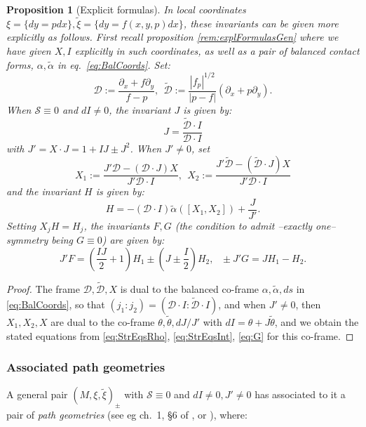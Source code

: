 \documentclass[10pt]{amsart}
\newcommand{\del}{\partial}
\newtheorem{prop}[thm]{Proposition}
\theoremstyle{definition}
\begin{document}
\begin{prop}[Explicit formulas]\label{rem:S0Sum}
    In local coordinates $\xi = \{ dy = pdx\}, \tilde \xi = \{ dy = f(x,y,p) dx\}$, these invariants can be given more explicitly as follows. First recall proposition \ref{rem:explFormulasGen} where we have given $X, I$ explicitly in such coordinates, as well as a pair of balanced contact forms, $\alpha,\tilde\alpha$ in eq.~\eqref{eq:BalCoords}. Set:
    \begin{equation}\label{eq:BalCoordFrame}
        \mathcal{D} := \frac{\del_x + f\del_y}{f-p}, ~~\mathcal{\tilde D} := \frac{|f_p|^{1/2}}{|p-f|} (\del_x + p\del_y).
    \end{equation}
     When $\mathcal{S}\equiv 0$ and $dI\ne 0$, the invariant $J$ is given by:
    \[ J = \frac{\mathcal{\tilde D} \cdot I}{\mathcal{D}\cdot I}\]
    with $J' = X\cdot J = 1 + IJ\pm J^2$. When $J'\ne 0$, set 
     \[ X_1 := \frac{ J'\mathcal{D} - (\mathcal{D}\cdot J) X}{J' \mathcal{D}\cdot I}, ~~X_2 := \frac{J'\mathcal{\tilde D} - (\mathcal{\tilde D}\cdot J) X}{J' \mathcal{D}\cdot I} \]
     and the invariant $H$ is given by:
    \[ H = - (\mathcal{D}\cdot I) \tilde\alpha ( [X_1, X_2]) + \frac{J}{J'}. \]
    Setting $X_jH = H_j$, the invariants $F, G$ (the condition to admit --exactly one-- symmetry being $G\equiv 0$) are given by:
    \[ J' F = \left( \frac{IJ}{2} + 1\right) H_1 \pm \left( J \pm \frac{I}{2}\right) H_2, ~~~ \pm J' G = J H_1 - H_2.  \]
\end{prop}

\begin{proof}
    The frame $\mathcal{D}, \mathcal{\tilde D}, X$ is dual to the balanced co-frame $\alpha, \tilde\alpha, ds$ in \eqref{eq:BalCoords}, so that $(j_1 : j_2) = (\mathcal{D}\cdot I: \mathcal{\tilde D}\cdot I)$, and when $J'\ne 0$, then $X_1, X_2, X$ are dual to the co-frame $\theta, \tilde\theta, dJ/J'$ with $dI = \theta + J\tilde\theta$, and we obtain the stated equations from \eqref{eq:StrEqsRho}, \eqref{eq:StrEqsInt}, \eqref{eq:G} for this co-frame.
\end{proof}

\subsubsection{Associated path geometries}\label{rem:S0PG}
   A general pair $(M, \xi, \tilde \xi)_\pm$ with $\mathcal{S} \equiv 0$ and $dI\ne 0, J'\ne 0$ has associated to it a pair of {\em path geometries} (see eg ch.~1, \S 6 of \cite{Arnold}, or \cite{BGH}), where:
\end{document}
